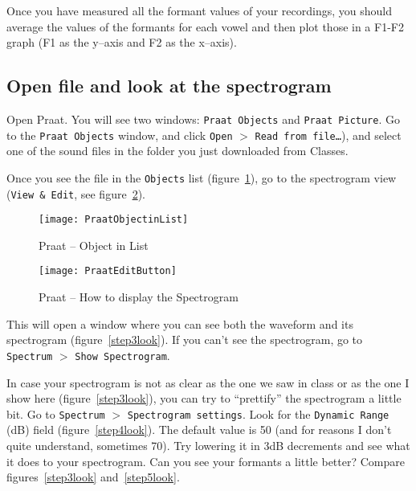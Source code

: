 \documentclass{article}
\newcommand{\soft}[1]{\textsf{#1}}
\newcommand{\softmenu}[1]{\texttt{#1}}
\newcommand{\Praat}{\soft{Praat}}
\newcommand{\Classes}{\soft{Classes}}
\begin{document}
Once you have measured all the formant values of your recordings, you should average the values of the formants for each vowel and then plot those in a F1-F2 graph (F1 as the y--axis and F2 as the x--axis).

\subsection{Open file and look at the spectrogram}

Open \Praat{}. You will see two windows: \softmenu{Praat Objects} and \softmenu{Praat Picture}. Go to the \softmenu{Praat Objects} window, and click  \softmenu{Open} $>$ \softmenu{Read from file\ldots}), and select one of the sound files in the folder you just downloaded from \Classes{}.

Once you see the file in the \softmenu{Objects} list (figure~\ref{step1look}), go to the spectrogram view (\softmenu{View \& Edit}, see figure~\ref{step2look}).

\begin{figure}[!tbp]
\caption{\Praat{} -- Object in List}
\label{step1look}
	\begin{center}
		\texttt{[image: PraatObjectinList]}
	\end{center}
\end{figure}

\begin{figure}[!tbp]
\caption{\Praat{} -- How to display the Spectrogram}
\label{step2look}
	\begin{center}
		\texttt{[image: PraatEditButton]}
	\end{center}
\end{figure}

This will open a window where you can see both the waveform and its spectrogram (figure~\ref{step3look}). If you can't see the spectrogram, go to \softmenu{Spectrum} $>$ \softmenu{Show Spectrogram}.

In case your spectrogram is not as clear as the one we saw in class or as the one I show here (figure~\ref{step3look}), you can try to ``prettify'' the spectrogram a little bit. Go to \softmenu{Spectrum} $>$ \softmenu{Spectrogram settings}. Look for the \softmenu{Dynamic Range} (dB) field (figure~\ref{step4look}). The default value is 50 (and for reasons I don't quite understand, sometimes 70). Try lowering it in 3dB decrements and see what it does to your spectrogram. Can you see your formants a little better? Compare figures~\ref{step3look} and~\ref{step5look}.
\end{document}
